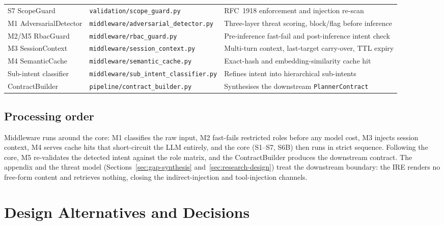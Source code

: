 \begin{table}[h]
\begin{tabular}{@{}p{2.9cm}>{\raggedright\arraybackslash}p{4.7cm}>{\raggedright\arraybackslash}p{5.8cm}@{}}
S7 ScopeGuard & \texttt{validation/}\allowbreak\texttt{scope\_}\allowbreak\texttt{guard.py} & RFC~1918 enforcement and injection re-scan\\
M1 AdversarialDetector & \texttt{middleware/}\allowbreak\texttt{adversarial\_}\allowbreak\texttt{detector.py} & Three-layer threat scoring, block/flag before inference\\
M2/M5 RbacGuard & \texttt{middleware/}\allowbreak\texttt{rbac\_}\allowbreak\texttt{guard.py} & Pre-inference fast-fail and post-inference intent check\\
M3 SessionContext & \texttt{middleware/}\allowbreak\texttt{session\_}\allowbreak\texttt{context.py} & Multi-turn context, last-target carry-over, TTL expiry\\
M4 SemanticCache & \texttt{middleware/}\allowbreak\texttt{semantic\_}\allowbreak\texttt{cache.py} & Exact-hash and embedding-similarity cache hit\\
Sub-intent classifier & \texttt{middleware/}\allowbreak\texttt{sub\_}\allowbreak\texttt{intent\_}\allowbreak\texttt{classifier.py} & Refines intent into hierarchical sub-intents\\
ContractBuilder & \texttt{pipeline/}\allowbreak\texttt{contract\_}\allowbreak\texttt{builder.py} & Synthesises the downstream \texttt{PlannerContract}\\
\bottomrule
\end{tabular}
\end{table}

\subsection*{Processing order}

Middleware runs around the core: M1 classifies the raw input, M2 fast-fails
restricted roles before any model cost, M3 injects session context, M4 serves
cache hits that short-circuit the LLM entirely, and the core (S1--S7, S6B) then
runs in strict sequence. Following the core, M5 re-validates the detected
intent against the role matrix, and the ContractBuilder produces the
downstream contract. The appendix and the threat model
(Sections~\ref{sec:gap-synthesis} and~\ref{sec:research-design}) treat the
downstream boundary: the IRE renders no free-form content and retrieves
nothing, closing the indirect-injection and tool-injection channels.


\section{Design Alternatives and Decisions}\label{sec:design-alternatives}

